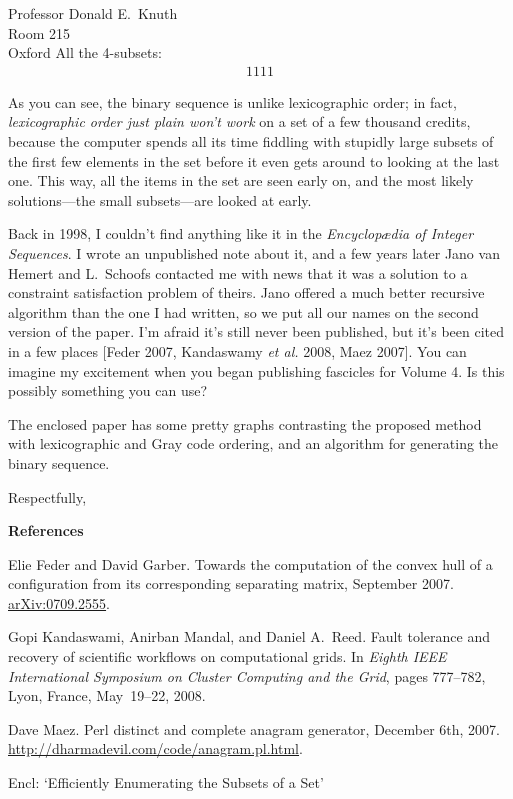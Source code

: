 \documentclass[12pt,a4paper]{letter}
\begin{document}
\begin{letter}{Professor Donald E.~Knuth \\ Room 215 \\ Oxford}
All the 4-subsets: \begin{eqnarray*}
	1111
\end{eqnarray*}

As you can see, the binary sequence is unlike lexicographic order; in fact,
\emph{lexicographic order just plain won't work} on a set of a few thousand credits,
because the
computer spends all its time fiddling with stupidly large subsets of the
first few elements in the set 
before it even gets around to looking at the last one.
This way, all
the items in the set are seen early on, and the most likely
solutions---the small subsets---are looked at early.

Back in 1998, I couldn't find anything like it in the \emph{Encyclop\ae dia of
Integer Sequences}.  I wrote an unpublished note about it, and a few years later
Jano van Hemert and L.~Schoofs
contacted me with news that it was a solution to a constraint satisfaction problem
of theirs.  Jano offered a much better recursive algorithm than the one I had
written, so we put all our names on the second version
of the paper.  I'm afraid it's still never been published, but it's been cited in a
few places [Feder 2007, Kandaswamy \emph{et al.} 2008, Maez 2007].  You can imagine my
excitement when you began publishing fascicles for Volume 4.  Is this possibly
something you can use?

The enclosed paper has some pretty graphs contrasting the proposed method
with lexicographic and Gray code ordering, and an algorithm for generating
the binary sequence.

\closing{Respectfully,}

{\bf\large References}

Elie Feder and David Garber.  Towards the computation of the convex
hull of a configuration from its corresponding separating matrix, September 2007.
\url{arXiv:0709.2555}.

Gopi Kandaswami, Anirban Mandal, and Daniel A.~Reed. Fault tolerance and recovery
of scientific workflows on computational grids. In \emph{Eighth IEEE International
Symposium on Cluster Computing and the Grid}, pages 777--782, Lyon, France,
May~19--22, 2008.

Dave Maez. Perl distinct and complete anagram generator, December 6th, 2007.
\url{http://dharmadevil.com/code/anagram.pl.html}.

Encl: `Efficiently Enumerating the Subsets of a Set'

\end{letter}
\end{document}
